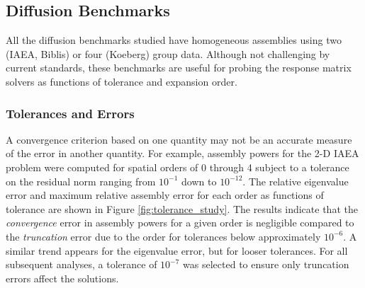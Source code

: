 \subsection{Diffusion Benchmarks}

All the diffusion benchmarks studied have homogeneous
assemblies using two (IAEA, Biblis) or four (Koeberg) group 
data.  Although not challenging by current standards, these 
benchmarks are useful for probing the response matrix solvers
as functions of tolerance and expansion order.

\subsubsection{Tolerances and Errors}

A convergence criterion based on 
one quantity may not be an accurate measure of the error in 
another quantity.  For example, assembly powers for the 2-D IAEA 
problem were computed for spatial orders of 0 through 4 subject to 
a tolerance on the residual norm ranging from $10^{-1}$ down to $10^{-12}$.
The relative eigenvalue error  and maximum relative assembly error for each
order as functions of 
tolerance are shown in Figure \ref{fig:tolerance_study}.
The results indicate that the {\it convergence} error in assembly powers 
for a  given order is negligible compared to 
the {\it truncation} error due to the order for tolerances
below approximately $10^{-6}$.  A similar trend appears for the eigenvalue 
error, but for looser tolerances.  For all subsequent  
analyses, a tolerance of $10^{-7}$ was selected to ensure only 
truncation errors affect the solutions.

